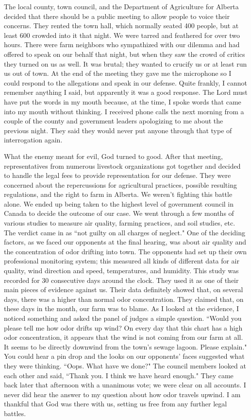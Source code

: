 \documentclass[oneside]{book}
\begin{document}
The local county, town council, and the Department of Agriculture for Alberta decided that there should be a public meeting to allow people to voice their concerns. They rented the town hall, which normally seated 400 people, but at least 600 crowded into it that night. We were tarred and feathered for over two hours. There were farm neighbors who sympathized with our dilemma and had offered to speak on our behalf that night, but when they saw the crowd of critics they turned on us as well. It was brutal; they wanted to crucify us or at least run us out of town. At the end of the meeting they gave me the microphone so I could respond to the allegations and speak in our defense. Quite frankly, I cannot remember anything I said, but apparently it was a good response. The Lord must have put the words in my mouth because, at the time, I spoke words that came into my mouth without thinking. I received phone calls the next morning from a couple of the county and government leaders apologizing to me about the previous night. They said they would never put anyone through that type of interrogation again. 

What the enemy meant for evil, God turned to good. After that meeting, representatives from numerous livestock organizations got together and decided to handle the legal fees to provide representation for our defense. They were concerned about the repercussions for agricultural practices, possible resulting regulations, and the right to farm in Alberta. We weren't fighting this battle alone. We ended up being taken to the highest level of government council in Canada to decide the outcome of our case. We went through a few months of various studies to measure air quality, farming practices, and soil studies, etc. The verdict came in as ``not guilty on all charges of neglect." One of the deciding factors, as we faced our opponents at the final hearing, was about air quality and the concentration of odor drifting into town. The opponents had set up their own professional monitoring system; this measured all kinds of different data for air quality, wind direction and speed, temperatures, and humidity. This study was recorded for 30 consecutive days around the clock. They used it as one of their main pieces of evidence against us. Their data definitely showed that, on several days, there was a higher than normal odor concentration. They claimed that, on these days in the month, our farm was to blame. As I looked at the evidence, I noticed something and asked the panel of judges a simple question. ``Would you please tell me how odor drifts up wind? On every day that this chart has a high odor concentration, it appears that the wind is not coming from our farm at all. It seems to be directly downwind from the town's sewage lagoon. Please explain." You could hear a pin drop and the looks on our opponents' faces suggested what they were thinking. ``Oops. What have we done?" The council members looked at each other and said, ``Thank you. I think we have heard enough." They came back later that afternoon with a unanimous vote; we were clear on all accounts. I never did hear the answer to my question about how odor travels upwind. I am thankful that God was there with us, setting us free from any further legal battles. 
\end{document}
